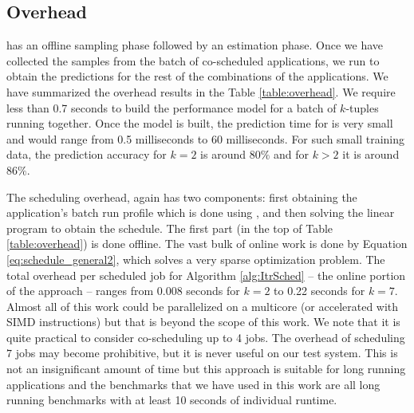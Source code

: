 \subsection{Overhead}
\label{sec:expt:overhead}
\SYSTEM{} has an offline sampling phase followed by an
estimation phase. Once we have collected the samples from the batch of
co-scheduled applications, we run \SYSTEM{} to obtain the predictions
for the rest of the combinations of the applications. We have
summarized the overhead results in the Table \ref{table:overhead}. We
require less than 0.7 seconds to build the performance model for a
batch of $k$-tuples running together. Once the model is built, the
prediction time for \SYSTEM{} is very small and would range from 0.5
milliseconds to 60 milliseconds. For such small training data, the
prediction accuracy for $k=2$ is around $80\%$ and for $k>2$ it is
around $86\%$.

The scheduling overhead, again has two components: first obtaining the
application's batch run profile which is done using \SYSTEM{}, and
then solving the linear program to obtain the schedule. The first part
(in the top of Table \ref{table:overhead}) is done offline.  The vast
bulk of online work is done by Equation \eqref{eq:schedule_general2},
which solves a very sparse optimization problem. The total overhead
per scheduled job for Algorithm \ref{alg:ItrSched} -- the online
portion of the approach -- ranges from 0.008 seconds for $k=2$ to 0.22
seconds for $k=7$. Almost all of this work could be parallelized on a
multicore (or accelerated with SIMD instructions) but that is beyond
the scope of this work.  We note that it is quite practical to
consider co-scheduling up to 4 jobs.  The overhead of scheduling $7$
jobs may become prohibitive, but it is never useful on our test
system.  This is not an insignificant amount of time but this approach
is suitable for long running applications and the benchmarks that we
have used in this work are all long running benchmarks with at least
10 seconds of individual runtime.
